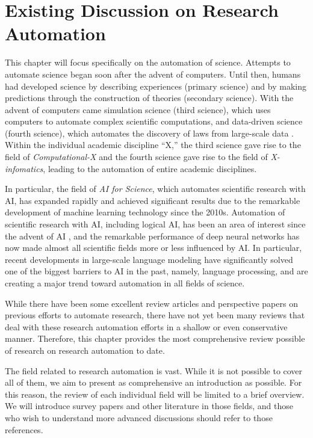 \chapter{Existing Discussion on Research Automation}
\label{chapter-literature-review}

This chapter will focus specifically on the automation of science. Attempts to automate science began soon after the advent of computers. Until then, humans had developed science by describing experiences (primary science) and by making predictions through the construction of theories (secondary science). With the advent of computers came simulation science (third science), which uses computers to automate complex scientific computations, and data-driven science (fourth science), which automates the discovery of laws from large-scale data \cite{hey2009fourth}. Within the individual academic discipline ``X,'' the third science gave rise to the field of \textit{Computational-X} and the fourth science gave rise to the field of \textit{X-infomatics}, leading to the automation of entire academic disciplines.

In particular, the field of \textit{AI for Science}, which automates scientific research with AI, has expanded rapidly and achieved significant results due to the remarkable development of machine learning technology since the 2010s. Automation of scientific research with AI, including logical AI, has been an area of interest since the advent of AI \cite{langley1987scientific}, and the remarkable performance of deep neural networks has now made almost all scientific fields more or less influenced by AI. In particular, recent developments in large-scale language modeling have significantly solved one of the biggest barriers to AI in the past, namely, language processing, and are creating a major trend toward automation in all fields of science.

While there have been some excellent review articles and perspective papers on previous efforts to automate research, there have not yet been many reviews that deal with these research automation efforts in a shallow or even conservative manner. Therefore, this chapter provides the most comprehensive review possible of research on research automation to date.

The field related to research automation is vast. While it is not possible to cover all of them, we aim to present as comprehensive an introduction as possible. For this reason, the review of each individual field will be limited to a brief overview. We will introduce survey papers and other literature in those fields, and those who wish to understand more advanced discussions should refer to those references.

